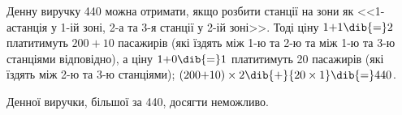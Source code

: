 Денну виручку 440 можна отримати, якщо розбити станції на зони 
як <<\mbox{1-а}\nolinebreak[3] станція у \mbox{1-ій} зоні, 
\mbox{2-а} та \mbox{3-я} станції у \mbox{2-ій} зоні>>.
Тоді ціну ${1{+}1}\dib{{=}}2$ платитимуть ${200{+}10}$ пасажирів 
(які їздять між \mbox{1-ю} та \mbox{2-ю} та 
між \mbox{1-ю} та \mbox{3-ю} станціями відповідно),
а ціну ${1{+}0}\dib{{=}}1$ платитимуть 20 пасажирів 
(які їздять між \mbox{2-ю} та \mbox{3-ю} станціями); 
${(200{+}10)\times2}\dib{{+}}{20\times1}\dib{{=}}440$.

Денної виручки, більшої за 440, досягти неможливо.


